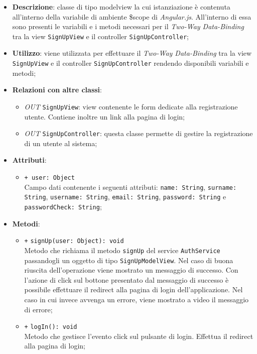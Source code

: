 	\begin{itemize}
		\item \textbf{Descrizione}: classe di tipo modelview la cui istanziazione è contenuta all'interno della variabile di ambiente \$scope di \textit{Angular.js}. All'interno di essa sono presenti le variabili e i metodi necessari per il \textit{Two-Way Data-Binding} tra la view \texttt{SignUpView} e il controller \texttt{SignUpController};
		\item \textbf{Utilizzo}: viene utilizzata per effettuare il \textit{Two-Way Data-Binding} tra la view \texttt{SignUpView} e il controller \texttt{SignUpController} rendendo disponibili variabili e metodi;
		\item \textbf{Relazioni con altre classi}: 
		\begin{itemize}
			\item \textit{OUT} \texttt{SignUpView}: view contenente le form dedicate alla registrazione utente. Contiene inoltre un link alla pagina di login; 
			\item \textit{OUT} \texttt{SignUpController}: questa classe permette di gestire la registrazione di un utente al sistema;
		\end{itemize}
		\item \textbf{Attributi}: 
		\begin{itemize}
			\item \texttt{+ user: Object} \\ Campo dati contenente i seguenti attributi: \texttt{name: String}, \texttt{surname: String}, \texttt{username: String}, \texttt{email: String}, \texttt{password: String} e \texttt{passwordCheck: String};
		\end{itemize}
		\item \textbf{Metodi}: 
		\begin{itemize}
			\item \texttt{+} \texttt{signUp(user: Object): void} \\
			Metodo che richiama il metodo \texttt{signUp} del service \texttt{AuthService} passandogli un oggetto di tipo \texttt{SignUpModelView}. Nel caso di buona riuscita dell'operazione viene mostrato un messaggio di successo. Con l'azione di click sul bottone presentato dal messaggio di successo è possibile effettuare il redirect alla pagina di login dell'applicazione. Nel caso in cui invece avvenga un errore, viene mostrato a video il messaggio di errore;
			\item \texttt{+} \texttt{logIn(): void} \\
			Metodo che gestisce l’evento click sul pulsante di login. Effettua il redirect alla pagina di login;
		\end{itemize}
	\end{itemize}
	
	